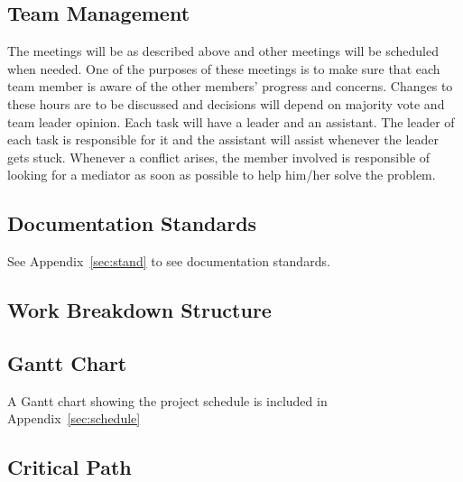 \subsection{Team Management}

The meetings will be as described above and other meetings will be scheduled
when needed. One of the purposes of these meetings is to make sure that each
team member is aware of the other members' progress and concerns. Changes to
these hours are to be discussed and decisions will depend on majority vote and
team leader opinion. Each task will have a leader and an assistant. The leader
of each task is responsible for it and the assistant will assist whenever the
leader gets stuck. Whenever a conflict arises, the member involved is
responsible of looking for a mediator as soon as possible to help him/her solve
the problem.

\subsection{Documentation Standards}
See Appendix~\ref{sec:stand} to see documentation standards.

\subsection{Work Breakdown Structure}

\subsection{Gantt Chart}
A Gantt chart showing the project schedule is included in Appendix~\ref{sec:schedule} 

\subsection{Critical Path}
